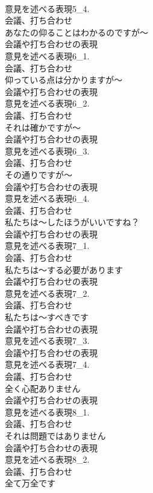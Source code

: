 \documentclass[8pt]{extreport}
\begin{document}
\begin{CJK}{UTF8}{min}
\\	意見を述べる表現5_4.
\\	会議、打ち合わせ
\\	あなたの仰ることはわかるのですが～	
\\	会議や打ち合わせの表現
\\	意見を述べる表現6_1.
\\	会議、打ち合わせ
\\	仰っている点は分かりますが～	
\\	会議や打ち合わせの表現
\\	意見を述べる表現6_2.
\\	会議、打ち合わせ
\\	それは確かですが～	
\\	会議や打ち合わせの表現
\\	意見を述べる表現6_3.
\\	会議、打ち合わせ
\\	その通りですが～	
\\	会議や打ち合わせの表現
\\	意見を述べる表現6_4.
\\	会議、打ち合わせ
\\	私たちは～したほうがいいですね？	
\\	会議や打ち合わせの表現
\\	意見を述べる表現7_1.
\\	会議、打ち合わせ
\\	私たちは～する必要があります	
\\	会議や打ち合わせの表現
\\	意見を述べる表現7_2.
\\	会議、打ち合わせ
\\	私たちは～すべきです	
\\	会議や打ち合わせの表現
\\	意見を述べる表現7_3.
\\	会議や打ち合わせの表現
\\	意見を述べる表現7_4.
\\	会議、打ち合わせ
\\	全く心配ありません	
\\	会議や打ち合わせの表現
\\	意見を述べる表現8_1.
\\	会議、打ち合わせ
\\	それは問題ではありません	
\\	会議や打ち合わせの表現
\\	意見を述べる表現8_2.
\\	会議、打ち合わせ
\\	全て万全です	

\end{CJK}
\end{document}
